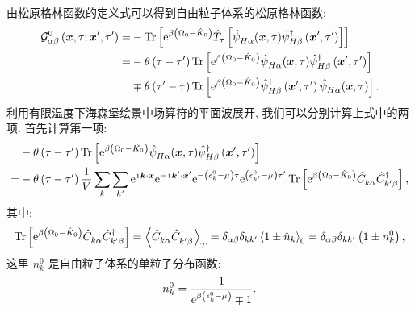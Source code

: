 由松原格林函数的定义式可以得到自由粒子体系的松原格林函数:
\begin{align}
\mathcal{G}_{\alpha \beta}^0\left(\boldsymbol{x}, \tau ; \boldsymbol{x}^{\prime}, \tau^{\prime}\right)= & -\operatorname{Tr}\left[\mathrm{e}^{\beta\left(\Omega_0-\hat{K}_0\right)} \hat{T}_\tau\left[\hat{\psi}^{}_{H \alpha}(\boldsymbol{x}, \tau) \hat{\psi}_{H \beta}^{\dagger}\left(\boldsymbol{x}^{\prime}, \tau^{\prime}\right)\right]\right] \nonumber\\
= & -\theta\left(\tau-\tau^{\prime}\right) \operatorname{Tr}\left[\mathrm{e}^{\beta\left(\Omega_0-\hat{K}_0\right)} \hat{\psi}^{}_{H \alpha}(\boldsymbol{x}, \tau) \hat{\psi}_{H \beta}^{\dagger}\left(\boldsymbol{x}^{\prime}, \tau^{\prime}\right)\right]\nonumber \\
& \mp \theta\left(\tau^{\prime}-\tau\right) \operatorname{Tr}\left[\mathrm{e}^{\beta\left(\Omega_0-\hat{K}_0\right)} \hat{\psi}_{H \beta}^{\dagger}\left(\boldsymbol{x}^{\prime}, \tau^{\prime}\right) \hat{\psi}^{}_{H \alpha}(\boldsymbol{x}, \tau)\right] .
\end{align}
利用有限温度下海森堡绘景中场算符的平面波展开, 我们可以分别计算上式中的两项. 首先计算第一项:
\begin{equation}
\begin{aligned}
& -\theta\left(\tau-\tau^{\prime}\right) \operatorname{Tr}\left[\mathrm{e}^{\beta\left(\Omega_0-\hat{K}_0\right)} \hat{\psi}^{}_{H \alpha}(\boldsymbol{x}, \tau) \hat{\psi}_{H \beta}^{\dagger}\left(\boldsymbol{x}^{\prime}, \tau^{\prime}\right)\right] \\
= & -\theta\left(\tau-\tau^{\prime}\right) \frac{1}{V} \sum_k \sum_{k^{\prime}} \mathrm{e}^{\hspace{0.1em}\mathrm{i}\hspace{0.1em} \boldsymbol{k} \cdot \boldsymbol{x}} \mathrm{e}^{-\hspace{0.1em}\mathrm{i}\hspace{0.1em} \boldsymbol{k}^{\prime} \cdot \boldsymbol{x}^{\prime}} \mathrm{e}^{-\left(\epsilon_k^0-\mu\right) \tau} \mathrm{e}^{\left(\epsilon_{k^{\prime}}^0-\mu\right) \tau^{\prime}} \operatorname{Tr}\left[\mathrm{e}^{\beta\left(\Omega_0-\hat{K}_0\right)} \hat{C}^{}_{k \alpha} \hat{C}_{k^\prime \beta}^{\dagger}\right],
\end{aligned}
\end{equation}
其中:
\begin{equation}
\operatorname{Tr}\left[\mathrm{e}^{\beta\left(\Omega_0-\hat{K}_0\right)} \hat{C}^{}_{k \alpha} \hat{C}_{k^\prime \beta}^{\dagger}\right]=\left\langle\hat{C}^{}_{k \alpha} \hat{C}_{k^\prime \beta}^{\dagger}\right\rangle_T=\delta_{\alpha \beta} \delta_{{k} k^{\prime}}\left\langle 1 \pm \hat{n}_k\right\rangle_0=\delta_{\alpha \beta} \delta_{{k} {k}^{\prime}}\left(1 \pm n_k^0\right),
\end{equation}
这里 $n_k^0$ 是自由粒子体系的单粒子分布函数:
\begin{equation}
n_k^0=\frac{1}{\mathrm{e}^{\beta\left(\epsilon_k^0-\mu\right)} \mp 1} .
\end{equation}
